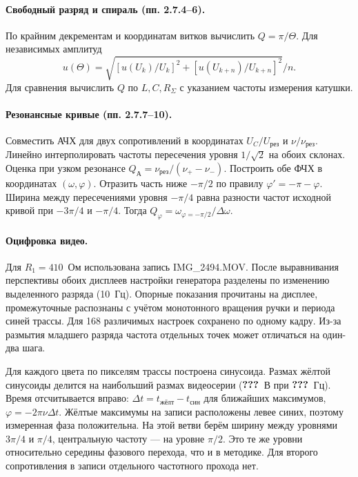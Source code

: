 \documentclass[a4paper,12pt]{article}
\makeatletter
\newcommand{\qq}{\textbf{???}}
\newcommand{\res}[1]{\ifcsname res@#1\endcsname\ensuremath{\csname res@#1\endcsname}\else\qq\fi}
\makeatother
\begin{document}
\paragraph{Свободный разряд и спираль (пп. 2.7.4--6).} По крайним декрементам и координатам витков вычислить $Q=\pi/\Theta$. Для независимых амплитуд\[u(\Theta)=\sqrt{[u(U_k)/U_k]^2+[u(U_{k+n})/U_{k+n}]^2}/n.\]Для сравнения вычислить $Q$ по $L,C,R_\Sigma$ с указанием частоты измерения катушки.
\paragraph{Резонансные кривые (пп. 2.7.7--10).} Совместить АЧХ для двух сопротивлений в координатах $U_C/U_{\textrm{рез}}$ и $\nu/\nu_{\textrm{рез}}$. Линейно интерполировать частоты пересечения уровня $1/\sqrt2$ на обоих склонах. Оценка при узком резонансе $Q_{\textrm{А}}=\nu_{\textrm{рез}}/(\nu_+-\nu_-)$. Построить обе ФЧХ в координатах $(\omega,\varphi)$. Отразить часть ниже $-\pi/2$ по правилу $\varphi'=-\pi-\varphi$. Ширина между пересечениями уровня $-\pi/4$ равна разности частот исходной кривой при $-3\pi/4$ и $-\pi/4$. Тогда $Q_{\varphi}=\omega_{\varphi=-\pi/2}/\Delta\omega$.
\paragraph{Оцифровка видео.} Для $R_1=410$~Ом использована запись IMG\_2494.MOV. После выравнивания перспективы обоих дисплеев настройки генератора разделены по изменению выделенного разряда (10~Гц). Опорные показания прочитаны на дисплее, промежуточные распознаны с учётом монотонного вращения ручки и периода синей трассы. Для 168 различимых настроек сохранено по одному кадру. Из-за размытия младшего разряда частота отдельных точек может отличаться на один-два шага.
\par Для каждого цвета по пикселям трассы построена синусоида. Размах жёлтой синусоиды делится на наибольший размах видеосерии ($\res{peakV1}$~В при $\res{peakFreq1}$~Гц). Время отсчитывается вправо: $\Delta t=t_{\textrm{жёлт}}-t_{\textrm{син}}$ для ближайших максимумов, $\varphi=-2\pi\nu\Delta t$. Жёлтые максимумы на записи расположены левее синих, поэтому измеренная фаза положительна. На этой ветви берём ширину между уровнями $3\pi/4$ и $\pi/4$, центральную частоту --- на уровне $\pi/2$. Это те же уровни относительно середины фазового перехода, что и в методике. Для второго сопротивления в записи отдельного частотного прохода нет.
\end{document}
